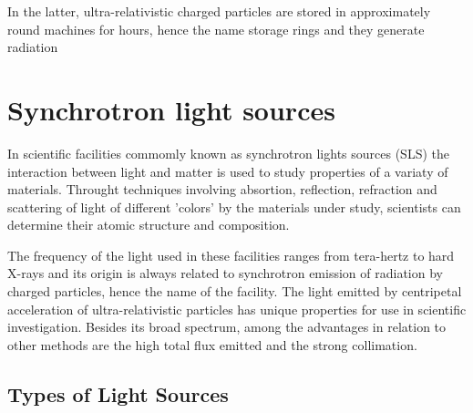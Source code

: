	In the latter, ultra-relativistic charged particles are stored in approximately round machines for hours, hence the name storage rings and they generate radiation

\section{Synchrotron light sources}

	In scientific facilities commomly known as synchrotron lights sources (SLS) the interaction between light and matter is used to study properties of a variaty of materials. Throught techniques involving absortion, reflection, refraction and scattering of light of different 'colors' by the materials under study, scientists can determine their atomic structure and composition.

  	The frequency of the light used in these facilities ranges from tera-hertz to hard X-rays and its origin is always related to synchrotron emission of radiation by charged particles, hence the name of the facility. The light emitted by centripetal acceleration of ultra-relativistic particles has unique properties for use in scientific investigation. Besides its broad spectrum, among the advantages in relation to other methods are the high total flux emitted and the strong collimation.

\subsection{Types of Light Sources}

